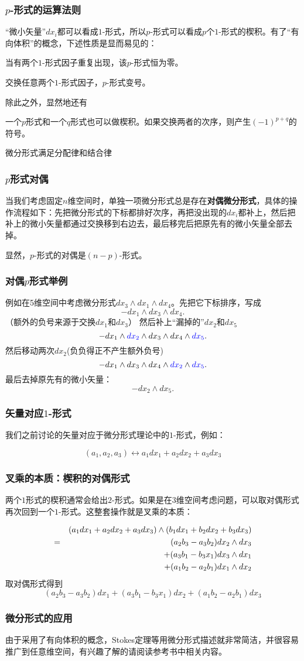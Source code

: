 \documentclass[CJK]{beamer}
\begin{document}
\begin{frame}
  \frametitle{$p$-形式的运算法则}
  “微小矢量”$dx_i$都可以看成$1$-形式，所以$p$-形式可以看成$p$个$1$-形式的楔积。有了“有向体积”的概念，下述性质是显而易见的：
  \bitem
\item{当有两个$1$-形式因子重复出现，该$p$-形式恒为零。}
\item{交换任意两个$1$-形式因子，$p$-形式变号。}
  \eitem

  除此之外，显然地还有
  \bitem
  \item{一个$p$形式和一个$q$形式也可以做楔积。如果交换两者的次序，则产生$(-1)^{p+q}$的符号。}
\item{微分形式满足分配律和结合律}
  \eitem
\end{frame}


\begin{frame}
  \frametitle{$p$形式对偶}
  当我们考虑固定$n$维空间时，单独一项微分形式总是存在{\bf 对偶微分形式}，具体的操作流程如下：先把微分形式的下标都排好次序，再把没出现的$dx_i$都补上，然后把补上的微小矢量都通过交换移到右边去，最后移完后把原先有的微小矢量全部去掉。

  \skipline

  显然，$p$-形式的对偶是$(n-p)$-形式。
\end{frame}

\begin{frame}
  \frametitle{对偶$p$形式举例}
  例如在5维空间中考虑微分形式$dx_3\wedge dx_1\wedge dx_4$。先把它下标排序，写成
  $$ - dx_1\wedge dx_3\wedge dx_4.$$
  （额外的负号来源于交换$dx_1$和$dx_3$）
  然后补上``漏掉的''$dx_2$和$dx_5$
  $$ - dx_1\wedge {\color{blue}dx_2}\wedge dx_3\wedge dx_4\wedge {\color{blue}dx_5}.$$
  然后移动两次$dx_2$(负负得正不产生额外负号)
  $$ - dx_1\wedge dx_3\wedge dx_4  \wedge {\color{blue}dx_2}\wedge {\color{blue}dx_5}.$$
  最后去掉原先有的微小矢量：
  $$ - dx_2\wedge dx_5.$$
\end{frame}

\begin{frame}
  \frametitle{矢量对应$1$-形式}
  我们之前讨论的矢量对应于微分形式理论中的$1$-形式，例如：
  
  $$ (a_1, a_2, a_3)\leftrightarrow a_1dx_1 +a_2dx_2 +a_3dx_3 $$
\end{frame}


\begin{frame}
  \frametitle{叉乘的本质：楔积的对偶形式}
  两个$1$形式的楔积通常会给出$2$-形式。如果是在3维空间考虑问题，可以取对偶形式再次回到一个$1$-形式。这整套操作就是叉乘的本质：

\begin{eqnarray}  
 && (a_1dx_1 +a_2dx_2 +a_3dx_3)\wedge(b_1dx_1+b_2dx_2+b_3dx_3) \nonumber \\
  = && (a_2b_3-a_3b_2)dx_2\wedge dx_3 \nonumber \\
  && + (a_3b_1-b_3x_1)dx_3\wedge dx_1 \nonumber \\
  && + (a_1b_2-a_2b_1) dx_1\wedge dx_2   \nonumber
\end{eqnarray}
取对偶形式得到
$$ (a_2b_3-a_3b_2)dx_1 + (a_3b_1-b_3x_1) dx_2 + (a_1b_2-a_2b_1) dx_3 $$
\end{frame}

\begin{frame}
  \frametitle{微分形式的应用}
  由于采用了有向体积的概念，Stokes定理等用微分形式描述就非常简洁，并很容易推广到任意维空间，有兴趣了解的请阅读参考书中相关内容。
\end{frame}

\ech
\end{document}
